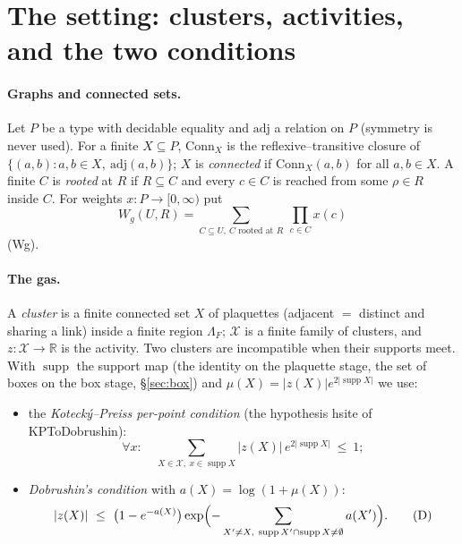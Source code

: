 \documentclass[11pt,a4paper]{article}
\theoremstyle{definition}
\theoremstyle{remark}
\DeclareRobustCommand{\lean}[1]{{\ttfamily\renewcommand{\_}{\textunderscore\allowbreak}#1}}
\newcommand{\R}{\mathbb{R}}
\newcommand{\supp}{\operatorname{supp}}
\begin{document}
\section{The setting: clusters, activities, and the two conditions}\label{sec:setting}

\paragraph{Graphs and connected sets.} Let $P$ be a type with decidable equality and $\mathrm{adj}$ a relation on $P$ (symmetry is never used). For a finite $X\subseteq P$, $\mathrm{Conn}_X$ is the reflexive--transitive closure of $\{(a,b):a,b\in X,\ \mathrm{adj}(a,b)\}$; $X$ is \emph{connected} if $\mathrm{Conn}_X(a,b)$ for all $a,b\in X$. A finite $C$ is \emph{rooted} at $R$ if $R\subseteq C$ and every $c\in C$ is reached from some $\rho\in R$ inside $C$. For weights $x:P\to[0,\infty)$ put
\[
W_g(U,R)=\sum_{C\subseteq U,\ C\text{ rooted at }R}\ \prod_{c\in C}x(c)
\]
(\lean{Wg}).

\paragraph{The gas.} A \emph{cluster} is a finite connected set $X$ of plaquettes (adjacent $=$ distinct and sharing a link) inside a finite region $\Lambda_F$; $\mathcal X$ is a finite family of clusters, and $z:\mathcal X\to\R$ is the activity. Two clusters are incompatible when their supports meet. With $\supp$ the support map (the identity on the plaquette stage, the set of boxes on the box stage, \S\ref{sec:box}) and $\mu(X)=|z(X)|e^{2|\supp X|}$ we use:
\begin{itemize}[leftmargin=2em]
\item the \emph{Kotecký--Preiss per-point condition} (the hypothesis \lean{hsite} of \lean{KPToDobrushin}):
\[
\forall x:\quad \sum_{X\in\mathcal X,\ x\in\supp X}|z(X)|\,e^{2|\supp X|}\ \le\ 1;\tag{KP}
\]
\item \emph{Dobrushin's condition} with $a(X)=\log(1+\mu(X))$:
\[
|z(X)|\ \le\ \bigl(1-e^{-a(X)}\bigr)\exp\Bigl(-\sum_{X'\ne X,\ \supp X'\cap\supp X\neq\emptyset}a(X')\Bigr).\tag{D}
\]
\end{itemize}
\end{document}

